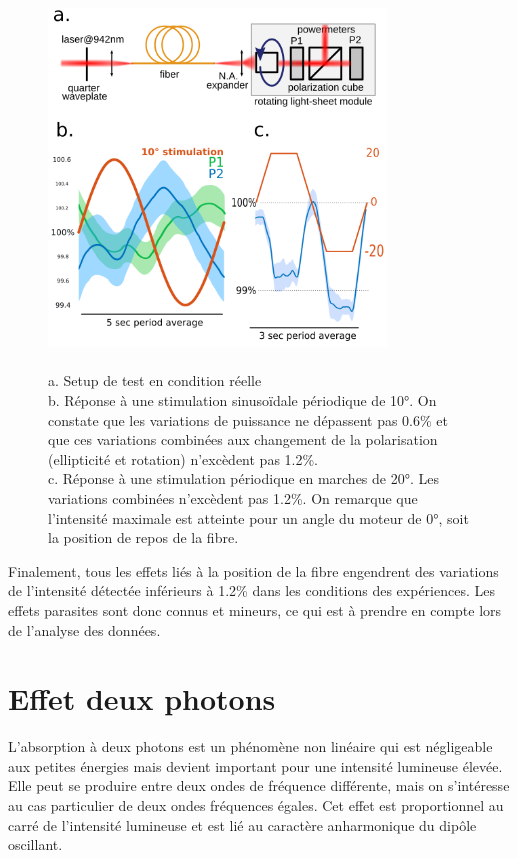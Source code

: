 \begin{figure}
\centering
\includegraphics[width=0.8\textwidth]{./files/real-condition_intensity-variation.png}
\caption{
\\ a. Setup de test en condition réelle
\\ b. Réponse à une stimulation sinusoïdale périodique de 10°. On constate que les variations de puissance ne dépassent pas 0.6\% et que ces variations combinées aux changement de la polarisation (ellipticité et rotation) n'excèdent pas 1.2\%.
\\ c. Réponse à une stimulation périodique en marches de 20°. Les variations combinées n'excèdent pas 1.2\%. On remarque que l'intensité maximale est atteinte pour un angle du moteur de 0°, soit la position de repos de la fibre.
}
\end{figure}

Finalement, tous les effets liés à la position de la fibre engendrent des variations de l'intensité détectée inférieurs à 1.2\% dans les conditions des expériences. Les effets parasites sont donc connus et mineurs, ce qui est à prendre en compte lors de l'analyse des données.

\section{Effet deux photons}

L'absorption à deux photons est un phénomène non linéaire qui est négligeable aux petites énergies mais devient important pour une intensité lumineuse élevée. Elle peut se produire entre deux ondes de fréquence différente, mais on s'intéresse au cas particulier de deux ondes fréquences égales. Cet effet est proportionnel au carré de l'intensité lumineuse et est lié au caractère anharmonique du dipôle oscillant.

